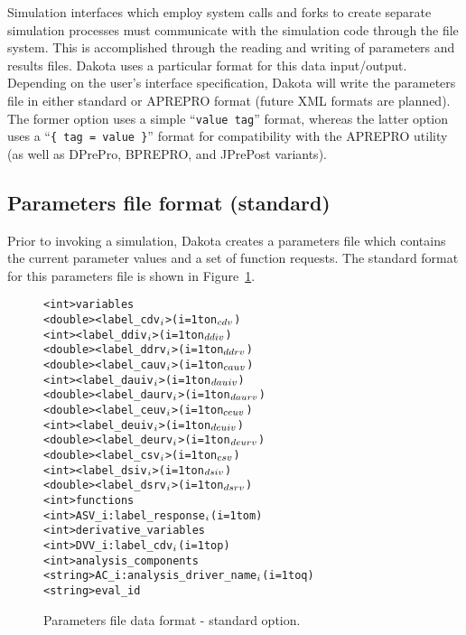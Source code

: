 Simulation interfaces which employ system calls and forks to create
separate simulation processes must communicate with the simulation
code through the file system. This is accomplished through the reading
and writing of parameters and results files. Dakota uses a particular
format for this data input/output. Depending on the user's interface
specification, Dakota will write the parameters file in either
standard or APREPRO format (future XML formats are planned). The
former option uses a simple ``\texttt{value tag}'' format, whereas the
latter option uses a ``\texttt{\{ tag = value \}}'' format for
compatibility with the APREPRO utility~\cite{Sja92} (as well as
DPrePro, BPREPRO, and JPrePost variants).

\subsection{Parameters file format (standard)}\label{variables:parameters:standard}

Prior to invoking a simulation, Dakota creates a parameters file which
contains the current parameter values and a set of function requests.
The standard format for this parameters file is shown in
Figure~\ref{variables:figure01}.

\begin{figure}
  \centering
  \begin{bigbox}
  \begin{alltt}
    <int>    variables
    <double> <label_cdv\(\sb{i}\)>         (i = 1 to n\(\sb{cdv}\))
    <int>    <label_ddiv\(\sb{i}\)>        (i = 1 to n\(\sb{ddiv}\))
    <double> <label_ddrv\(\sb{i}\)>        (i = 1 to n\(\sb{ddrv}\))
    <double> <label_cauv\(\sb{i}\)>        (i = 1 to n\(\sb{cauv}\))
    <int>    <label_dauiv\(\sb{i}\)>       (i = 1 to n\(\sb{dauiv}\))
    <double> <label_daurv\(\sb{i}\)>       (i = 1 to n\(\sb{daurv}\))
    <double> <label_ceuv\(\sb{i}\)>        (i = 1 to n\(\sb{ceuv}\))
    <int>    <label_deuiv\(\sb{i}\)>       (i = 1 to n\(\sb{deuiv}\))
    <double> <label_deurv\(\sb{i}\)>       (i = 1 to n\(\sb{deurv}\))
    <double> <label_csv\(\sb{i}\)>         (i = 1 to n\(\sb{csv}\))
    <int>    <label_dsiv\(\sb{i}\)>        (i = 1 to n\(\sb{dsiv}\))
    <double> <label_dsrv\(\sb{i}\)>        (i = 1 to n\(\sb{dsrv}\)) \color{blue}
    <int>    functions
    <int>    ASV_i:label_response\(\sb{i}\)       (i = 1 to m) \color{red}
    <int>    derivative_variables
    <int>    DVV_i:label_cdv\(\sb{i}\)            (i = 1 to p) \color{green}
    <int>    analysis_components
    <string> AC_i:analysis_driver_name\(\sb{i}\)  (i = 1 to q)
    <string> eval_id
  \end{alltt}
  \end{bigbox}
  \caption{Parameters file data format - standard option.}
  \label{variables:figure01}
\end{figure}

